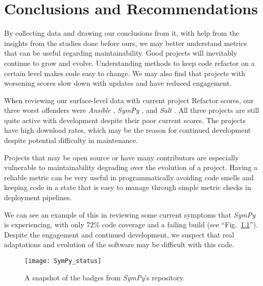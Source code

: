 \chapter{Conclusions and Recommendations} \label{chapterConclusion}



By collecting data and drawing our conclusions from it, with help from the insights from the studies done before ours, we may better understand metrics that can be useful regarding maintainability. Good projects will inevitably continue to grow and evolve. Understanding methods to keep code refactor on a certain level makes code easy to change. We may also find that projects with worsening scores slow down with updates and have reduced engagement.

When reviewing our surface-level data with current project Refactor scores, our three worst offenders were \emph{Ansible} \cite{data:ansible}, \emph{SymPy} \cite{data:sympy}, and \emph{Salt} \cite{data:salt}. All three projects are still quite active with development despite their poor current scores. The projects have high download rates, which may be the reason for continued development despite potential difficulty in maintenance.

Projects that may be open source or have many contributors are especially vulnerable to maintainability degrading over the evolution of a project. Having a reliable metric can be very useful in programmatically avoiding code smells and keeping code in a state that is easy to manage through simple metric checks in deployment pipelines.

We can see an example of this in reviewing some current symptoms that \emph{SymPy} is experiencing, with only 72\% code coverage and a failing build (see ``Fig.~\ref{figSymPyStatus}''). Despite the engagement and continued development, we suspect that real adaptations and evolution of the software may be difficult with this code.

\begin{figure}[ht]
    \centerline{
        \texttt{[image: SymPy\_status]}
    }
    \caption{A snapshot of the badges from \emph{SymPy}'s repository.}
    \label{figSymPyStatus}
\end{figure}


